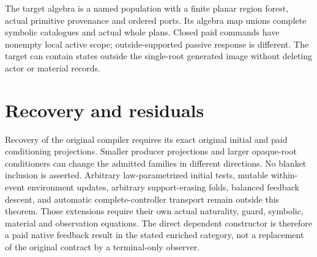\documentclass[11pt]{article}
\begin{document}
The target algebra is a named population with a finite planar region forest, actual primitive provenance and ordered ports. Its algebra map unions complete symbolic catalogues and actual whole plans. Closed paid commands have nonempty local active scope; outside-supported passive response is different. The target can contain states outside the single-root generated image without deleting actor or material records.

\section{Recovery and residuals}
Recovery of the original compiler requires its exact original initial and paid conditioning projections. Smaller producer projections and larger opaque-root conditioners can change the admitted families in different directions. No blanket inclusion is asserted. Arbitrary law-parametrized initial tests, mutable within-event environment updates, arbitrary support-erasing folds, balanced feedback descent, and automatic complete-controller transport remain outside this theorem. Those extensions require their own actual naturality, guard, symbolic, material and observation equations. The direct dependent constructor is therefore a paid native feedback result in the stated enriched category, not a replacement of the original contract by a terminal-only observer.
\end{document}
